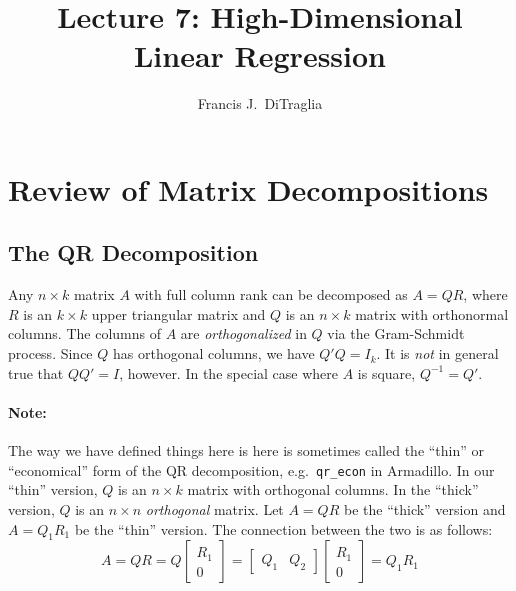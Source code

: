 \documentclass[12pt]{article}
\theoremstyle{definition}
\begin{document}
\title{Lecture 7: High-Dimensional Linear Regression}

\author{Francis J.\ DiTraglia}

\maketitle 

\section{Review of Matrix Decompositions}


\subsection{The QR Decomposition}
Any $n\times k$ matrix $A$ with full column rank can be decomposed as $A = QR$, where $R$ is an $k\times k$ upper triangular matrix and $Q$ is an $n\times k$ matrix with orthonormal columns. The columns of $A$ are \emph{orthogonalized} in $Q$ via the Gram-Schmidt process. Since $Q$ has orthogonal columns, we have $Q'Q = I_k$. It is \emph{not} in general true that $QQ' = I$, however. In the special case where $A$ is square, $Q^{-1} = Q'$.

\paragraph{Note:} The way we have defined things here is here is sometimes called the ``thin'' or ``economical'' form of the QR decomposition, e.g.\ \texttt{qr\_econ} in Armadillo. In our ``thin'' version, $Q$ is an $n\times k$ matrix with orthogonal columns. In the ``thick'' version, $Q$ is an $n\times n$ \emph{orthogonal} matrix. Let $A = QR$ be the ``thick'' version and $A = Q_1 R_1$ be the ``thin'' version. The connection between the two is as follows:
  $$A = QR = Q \left[\begin{array}
    {c} R_1 \\ 0 
  \end{array} \right] = \left[  \begin{array}
    {cc} Q_1 & Q_2
  \end{array}\right]\left[\begin{array}
    {c} R_1 \\ 0 
  \end{array} \right] = Q_1 R_1$$
\end{document}
